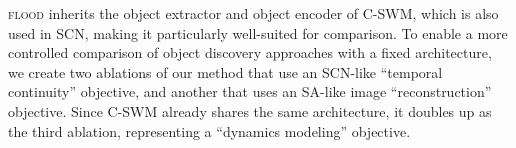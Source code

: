 \documentclass{article}
\newcommand{\jd}[1]{\textcolor{orange}{[DJ: #1]}}
\begin{document}
\textsc{flood} inherits the object extractor and object encoder of C-SWM, which is also used in SCN, making it particularly well-suited for comparison. To enable a more controlled comparison of object discovery approaches with a fixed architecture, we create two ablations of our method that use an SCN-like ``temporal continuity'' objective, and another that uses an SA-like image ``reconstruction'' objective. Since C-SWM already shares the same architecture, it doubles up as the third ablation, representing a ``dynamics modeling'' objective. %


\end{document}
